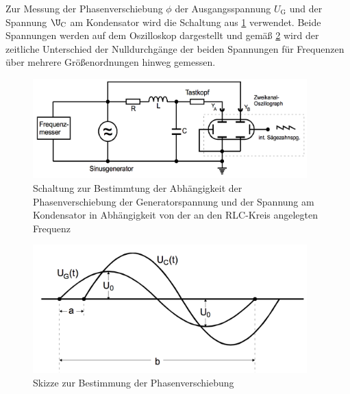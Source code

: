 Zur Messung der Phasenverschiebung $\phi$ der Ausgangsspannung $U_{\text{G}}$ und
der Spannung $\U_{\text{C}}$ am Kondensator wird die Schaltung aus \ref{fig:aufbau_4} verwendet.
Beide Spannungen werden auf dem Oszilloskop dargestellt und gemäß \ref{fig:phasenverschiebung} wird der
zeitliche Unterschied der Nulldurchgänge der beiden Spannungen für Frequenzen
über mehrere Größenordnungen hinweg gemessen.
\begin{figure}
  \centering
  \includegraphics[width=300pt]{data/aufbau_4.png}
  \caption{Schaltung zur Bestimmtung der Abhängigkeit der Phasenverschiebung der
  Generatorspannung und der Spannung am Kondensator in Abhängigkeit von der
  an den RLC-Kreis angelegten Frequenz \cite{Versuchsanleitung1}}
  \label{fig:aufbau_4}
\end{figure}
\begin{figure}
  \centering
  \includegraphics[width=300pt]{data/phasenverschiebung.png}
  \caption{Skizze zur Bestimmung der Phasenverschiebung \cite{Versuchsanleitung2}}
  \label{fig:phasenverschiebung}
\end{figure}
